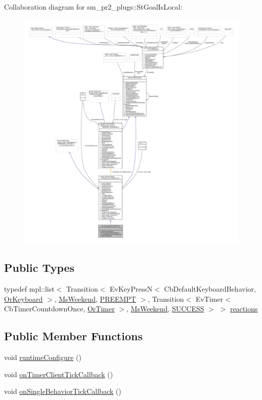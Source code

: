 Collaboration diagram for sm\+\_\+pr2\+\_\+plugs\+:\+:St\+Goal\+Is\+Local\+:
\nopagebreak
\begin{figure}[H]
\begin{center}
\leavevmode
\includegraphics[width=350pt]{structsm__pr2__plugs_1_1StGoalIsLocal__coll__graph}
\end{center}
\end{figure}
\subsection*{Public Types}
\begin{DoxyCompactItemize}
\item 
typedef mpl\+::list$<$ Transition$<$ Ev\+Key\+PressN$<$ Cb\+Default\+Keyboard\+Behavior, \hyperlink{classsm__pr2__plugs_1_1OrKeyboard}{Or\+Keyboard} $>$, \hyperlink{classsm__pr2__plugs_1_1MsWeekend}{Ms\+Weekend}, \hyperlink{classPREEMPT}{P\+R\+E\+E\+M\+PT} $>$, Transition$<$ Ev\+Timer$<$ Cb\+Timer\+Countdown\+Once, \hyperlink{classsm__pr2__plugs_1_1OrTimer}{Or\+Timer} $>$, \hyperlink{classsm__pr2__plugs_1_1MsWeekend}{Ms\+Weekend}, \hyperlink{classSUCCESS}{S\+U\+C\+C\+E\+SS} $>$ $>$ \hyperlink{structsm__pr2__plugs_1_1StGoalIsLocal_a17b287ba0fef5b866b0454cccc52d341}{reactions}
\end{DoxyCompactItemize}
\subsection*{Public Member Functions}
\begin{DoxyCompactItemize}
\item 
void \hyperlink{structsm__pr2__plugs_1_1StGoalIsLocal_aeddacc72a9eefe2a51d24564874f1610}{runtime\+Configure} ()
\item 
void \hyperlink{structsm__pr2__plugs_1_1StGoalIsLocal_a3a851e3468f6b247139f16abd1b91af3}{on\+Timer\+Client\+Tick\+Callback} ()
\item 
void \hyperlink{structsm__pr2__plugs_1_1StGoalIsLocal_a4d5abf255b17a81fe4a758a07f502e7d}{on\+Single\+Behavior\+Tick\+Callback} ()
\end{DoxyCompactItemize}
